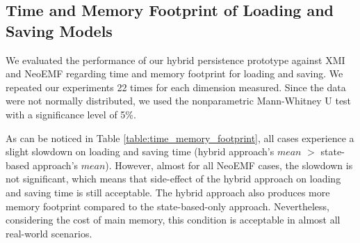 \documentclass{llncs}
\begin{document}
\vspace{-25pt}
\subsection{Time and Memory Footprint of Loading and Saving Models}
\label{sec:model_loading_time}

\vspace{-10pt}
We evaluated the performance of our hybrid persistence prototype against XMI and NeoEMF regarding time and memory footprint for loading and saving. We repeated our experiments 22 times for each dimension measured. Since the data were not normally distributed, we used the nonparametric Mann-Whitney U test \cite{doi:10.1002/9780470479216.corpsy0524} with a significance level of 5\%. 

As can be noticed in Table \ref{table:time_memory_footprint}, all cases experience a slight slowdown on loading and saving time (hybrid approach's $mean$ $>$ state-based approach's $mean$). However, almost for all NeoEMF cases, the slowdown is not significant, which means that side-effect of the hybrid approach on loading and saving time is still acceptable. The hybrid approach also produces more memory footprint compared to the state-based-only approach. Nevertheless, considering the cost of main memory, this condition is acceptable in almost all real-world scenarios.


  
\end{document}
